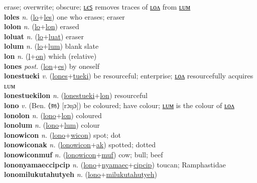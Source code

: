 erase; overwrite; obscure; \hyperref[loles]{ʟєꜱ} removes traces of \hyperref[lolon]{ʟᴏᴧ} from \hyperref[lolum]{ʟᴜᴍ} \label{lo} \\
\textbf{loles} \textit{n.} (\hyperref[lo]{lo}+\hyperref[les]{les})
one who erases; eraser \label{loles} \\
\textbf{lolon} \textit{n.} (\hyperref[lo]{lo}+\hyperref[lon]{lon})
erased \label{lolon} \\
\textbf{loluat} \textit{n.} (\hyperref[lo]{lo}+\hyperref[luat]{luat})
eraser \label{loluat} \\
\textbf{lolum} \textit{n.} (\hyperref[lo]{lo}+\hyperref[lum]{lum})
blank slate \label{lolum} \\
\textbf{lon} \textit{n.} (\hyperref[l]{l}+\hyperref[n]{on})
which (relative) \label{lon} \\
\textbf{lones} \textit{post.} (\hyperref[lon]{lon}+\hyperref[es]{es})
by oneself \label{lones} \\
\textbf{lonestueki} \textit{v.} (\hyperref[lones]{lones}+\hyperref[tueki]{tueki})
be resourceful; enterprise; \hyperref[lonestuekilon]{ʟᴏᴧ} resourcefully acquires ʟᴜᴍ \label{lonestueki} \\
\textbf{lonestuekilon} \textit{n.} (\hyperref[lonestueki]{lonestueki}+\hyperref[lon]{lon})
resourceful \label{lonestuekilon} \\
\textbf{lono} \textit{v.} (Ben. ⟨রঙ⟩ [rɔŋɔ])
be coloured; have colour; \hyperref[lonolum]{ʟᴜᴍ} is the colour of \hyperref[lonolon]{ʟᴏᴧ} \label{lono} \\
\textbf{lonolon} \textit{n.} (\hyperref[lono]{lono}+\hyperref[lon]{lon})
coloured \label{lonolon} \\
\textbf{lonolum} \textit{n.} (\hyperref[lono]{lono}+\hyperref[lum]{lum})
colour \label{lonolum} \\
\textbf{lonowicon} \textit{n.} (\hyperref[lono]{lono}+\hyperref[wicon]{wicon})
spot; dot \label{lonowicon} \\
\textbf{lonowiconak} \textit{n.} (\hyperref[lonowicon]{lonowicon}+\hyperref[ak]{ak})
spotted; dotted \label{lonowiconak} \\
\textbf{lonowiconmuf} \textit{n.} (\hyperref[lonowicon]{lonowicon}+\hyperref[muf]{muf})
cow; bull; beef \label{lonowiconmuf} \\
\textbf{lononyamaeccipcip} \textit{n.} (\hyperref[lono]{lono}+\hyperref[nyamaec]{nyamaec}+\hyperref[cipcip]{cipcip})
toucan; Ramphastidae \label{lononyamaeccipcip} \\
\textbf{lonomilukutahutyeh} \textit{n.} (\hyperref[lono]{lono}+\hyperref[milukutahutyeh]{milukutahutyeh})
